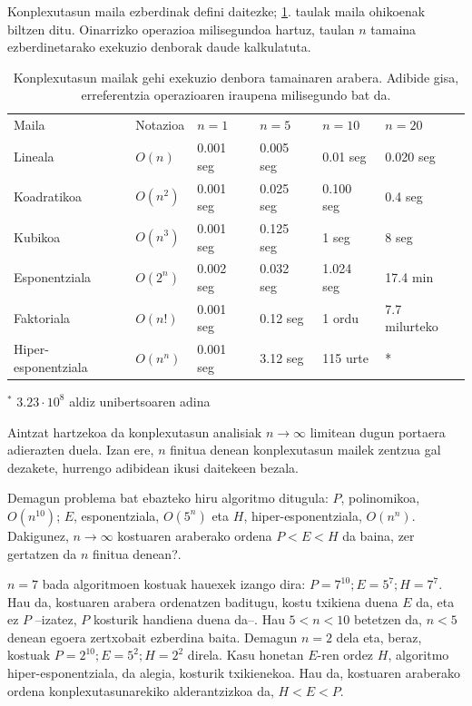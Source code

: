 \documentclass[eu]{ifirak}\usepackage[]{graphicx}\usepackage[]{color}
\begin{document}
Konplexutasun maila ezberdinak defini daitezke; \ref{tab:konplexutasun_mailak}. taulak maila ohikoenak biltzen ditu. Oinarrizko operazioa milisegundoa hartuz, taulan $n$ tamaina ezberdinetarako exekuzio denborak daude kalkulatuta.

\begin{table}[t]
\caption{Konplexutasun mailak gehi exekuzio denbora tamainaren arabera. Adibide gisa, erreferentzia operazioaren iraupena milisegundo bat da.}
\label{tab:konplexutasun_mailak}
\begin{tabular}{llllll}
Maila & Notazioa & $n=1$ & $n=5$ & $n=10$ & $n=20$\\
Lineala & $O(n)$ & 0.001 seg & 0.005 seg & 0.01 seg & 0.020 seg\\
Koadratikoa & $O(n^2)$ & 0.001 seg & 0.025 seg & 0.100 seg & 0.4 seg\\
Kubikoa & $O(n^3)$ & 0.001 seg & 0.125 seg & 1 seg & 8 seg \\
Esponentziala & $O(2^n)$ & 0.002 seg & 0.032 seg & 1.024 seg &  17.4 min \\
Faktoriala & $O(n!)$ & 0.001 seg & 0.12 seg & 1 ordu & 7.7 milurteko\\
Hiper-esponentziala & $O(n^n)$ & 0.001 seg & 3.12 seg & 115 urte & * \\
\end{tabular}
\begin{flushleft}
$^*$ $3.23\cdot10^8$ aldiz unibertsoaren adina
\end{flushleft}
\end{table}

Aintzat hartzekoa da konplexutasun analisiak $n\rightarrow \infty$ limitean dugun portaera adierazten duela. Izan ere, $n$ finitua denean konplexutasun mailek zentzua gal dezakete, hurrengo adibidean ikusi daitekeen bezala.

\begin{tcolorbox}
\begin{ifexample}
Demagun problema bat ebazteko hiru algoritmo ditugula: $P$, polinomikoa, $O(n^{10})$; $E$, esponentziala, $O(5^n)$ eta $H$, hiper-esponentziala, $O(n^n)$. Dakigunez, $n\rightarrow \infty$ kostuaren araberako ordena $P<E<H$ da baina, zer gertatzen da $n$ finitua denean?.

$n=7$ bada algoritmoen kostuak hauexek izango dira: $P=7^{10}; E=5^7; H=7^7$. Hau da, kostuaren arabera ordenatzen baditugu, kostu txikiena duena $E$ da, eta ez $P$ --izatez, $P$ kosturik handiena duena da--. Hau $5<n<10$ betetzen da, $n<5$ denean egoera zertxobait ezberdina baita. Demagun $n=2$ dela eta, beraz, kostuak  $P=2^{10}; E=5^2; H=2^2$ direla. Kasu honetan $E$-ren ordez $H$, algoritmo hiper-esponentziala, da alegia, kosturik txikienekoa. Hau da, kostuaren araberako ordena konplexutasunarekiko alderantzizkoa da, $H<E<P$.
\end{ifexample}
\end{tcolorbox}
\end{document}

